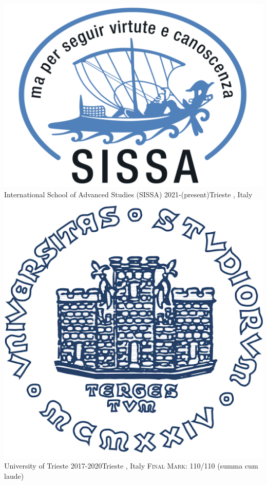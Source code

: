 \documentclass[10pt,a4paper]{altacv}
\begin{document}
 {   \includegraphics[scale=0.018]{SISSA.png} International School of Advanced Studies (SISSA)  }{2021-(present)}{Trieste , Italy } 
\divider
\\
 {   \includegraphics[scale=0.028]{logo} University of Trieste  }{2017-2020}{Trieste , Italy } 
\textsc{Final Mark}: 110/110 (summa cum laude)
\divider
\\
\end{document}
